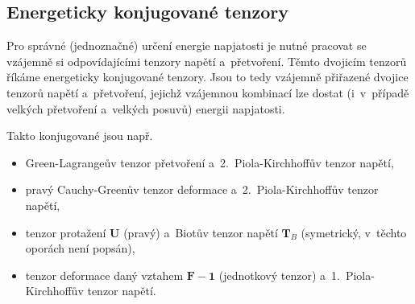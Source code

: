 
\subsection{Energeticky konjugované tenzory}
Pro správné (jednoznačné) určení energie napjatosti je nutné pracovat se vzájemně si odpovídajícími tenzory napětí a~přetvoření.
Těmto dvojicím tenzorů říkáme energeticky konjugované tenzory.
Jsou to tedy vzájemně přiřazené dvojice tenzorů napětí a~přetvoření, jejichž vzájemnou kombinací lze dostat (i~v~případě velkých přetvoření a~velkých posuvů) energii napjatosti.

Takto konjugované jsou např.
\begin{itemize}
	\item Green-Lagrangeův tenzor přetvoření a~2.~Piola-Kirchhoffův tenzor napětí,
	\item pravý Cauchy-Greenův tenzor deformace a~2.~Piola-Kirchhoffův tenzor napětí,
	\item tenzor protažení $\bm{U}$ (pravý) a~Biotův tenzor napětí $\bm{T}_B$ (symetrický, v~těchto oporách není popsán),
	\item tenzor deformace daný vztahem $\bm{F} - \bm{1}$ (jednotkový tenzor) a~1.~Piola-Kirchhoffův tenzor napětí.
\end{itemize}
